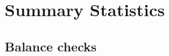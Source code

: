 \documentclass[11pt]{article}
\begin{document}
	\clearpage

%
%
%
%

\section{Summary Statistics}

	\subsection{Balance checks}
\end{document}
